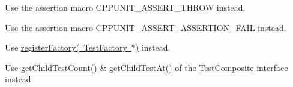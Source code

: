 \begin{DoxyRefList}
%
Use the assertion macro CPPUNIT\+\_\+\+ASSERT\+\_\+\+THROW instead.  
\item[Member \mbox{\hyperlink{group___writing_test_fixture_ga5bdaf0444216a8f93ead13d5ae964d7e}{CPPUNIT\+\_\+\+TEST\+\_\+\+FAIL}} (test\+Method)]\label{deprecated__deprecated000007}%
%
Use the assertion macro CPPUNIT\+\_\+\+ASSERT\+\_\+\+ASSERTION\+\_\+\+FAIL instead.  
\item[Member \mbox{\hyperlink{class_test_factory_registry_aff8d8215ec83fbb77d46706264e2f161}{Test\+Factory\+Registry\+::register\+Factory}} (const std\+::string \&name, \mbox{\hyperlink{class_test_factory}{Test\+Factory}} $\ast$factory)]\label{deprecated__deprecated000008}%
%
Use \mbox{\hyperlink{class_test_factory_registry_a632c38375727ca735e2c1897bd625b99}{register\+Factory( Test\+Factory $\ast$)}} instead.  
\item[Member \mbox{\hyperlink{class_test_suite_aee3f47de38785ddf3a3bf71c958675ff}{Test\+Suite\+::get\+Tests}} () const]\label{deprecated__deprecated000009}%
%
Use \mbox{\hyperlink{class_test_suite_a43d23da8ce3225af676ac259452098b0}{get\+Child\+Test\+Count()}} \& \mbox{\hyperlink{class_test_a9c4acb4752919c160a79e77b2beaa7f5}{get\+Child\+Test\+At()}} of the \mbox{\hyperlink{class_test_composite}{Test\+Composite}} interface instead. 
\end{DoxyRefList}